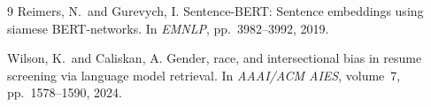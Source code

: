 \documentclass{article}
\begin{document}
\begin{thebibliography}{9}
Reimers, N.\ and Gurevych, I.
\newblock Sentence-BERT: Sentence embeddings using siamese BERT-networks.
\newblock In {\em EMNLP}, pp.\ 3982--3992, 2019.

Wilson, K.\ and Caliskan, A.
\newblock Gender, race, and intersectional bias in resume screening via language model retrieval.
\newblock In {\em AAAI/ACM AIES}, volume~7, pp.\ 1578--1590, 2024.

\end{thebibliography}
\end{document}
